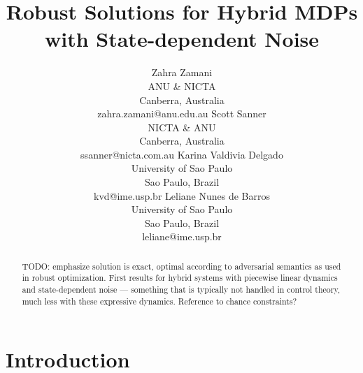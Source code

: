 \documentclass{article}
\title{	Robust Solutions for Hybrid MDPs with State-dependent Noise }
\author{Zahra Zamani\\
ANU \& NICTA\\
Canberra, Australia\\
zahra.zamani@anu.edu.au
\And
Scott Sanner\\
NICTA \& ANU\\
Canberra, Australia\\
ssanner@nicta.com.au
\And
Karina Valdivia Delgado\\
University of Sao Paulo\\
Sao Paulo, Brazil\\
kvd@ime.usp.br
\And
Leliane Nunes de Barros\\
University of Sao Paulo\\
Sao Paulo, Brazil\\
leliane@ime.usp.br}
\begin{document}
\maketitle

\begin{abstract}
TODO: emphasize solution is exact, optimal according to adversarial semantics
as used in robust optimization.  First results for hybrid systems with piecewise
linear dynamics and state-dependent noise --- something that is typically
not handled in control theory, much less with these expressive dynamics.
Reference to chance constraints?
\end{abstract}

\section{Introduction}

\cite{sanner_uai11}





\end{document}

